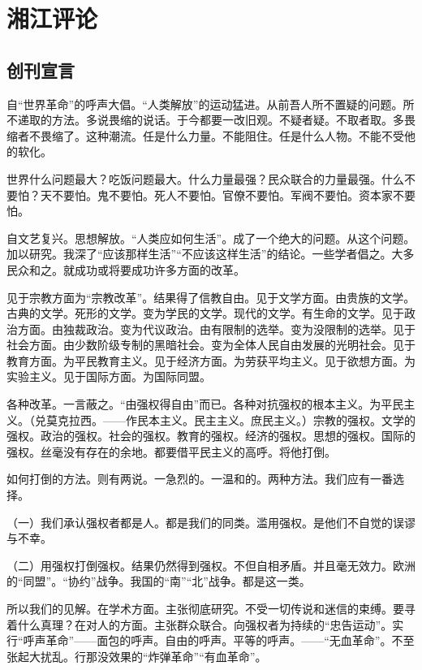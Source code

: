 \section{湘江评论}
\subsection[创刊宣言（一九一九年七月十四日）]{创刊宣言}


自“世界革命”的呼声大倡。“人类解放”的运动猛进。从前吾人所不置疑的问题。所不递取的方法。多说畏缩的说话。于今都要一改旧观。不疑者疑。不取者取。多畏缩者不畏缩了。这种潮流。任是什么力量。不能阻住。任是什么人物。不能不受他的软化。

世界什么问题最大？吃饭问题最大。什么力量最强？民众联合的力量最强。什么不要怕？天不要怕。鬼不要怕。死人不要怕。官僚不要怕。军阀不要怕。资本家不要怕。

自文艺复兴。思想解放。“人类应如何生活”。成了一个绝大的问题。从这个问题。加以研究。我深了“应该那样生活”“不应该这样生活”的结论。一些学者倡之。大多民众和之。就成功或将要成功许多方面的改革。

见于宗教方面为“宗教改革”。结果得了信教自由。见于文学方面。由贵族的文学。古典的文学。死形的文学。变为学民的文学。现代的文学。有生命的文学。见于政治方面。由独裁政治。变为代议政治。由有限制的选举。变为没限制的选举。见于社会方面。由少数阶级专制的黑暗社会。变为全体人民自由发展的光明社会。见于教育方面。为平民教育主义。见于经济方面。为劳获平均主义。见于欲想方面。为实验主义。见于国际方面。为国际同盟。

各种改革。一言蔽之。“由强权得自由”而已。各种对抗强权的根本主义。为平民主义。（兑莫克拉西。——作民本主义。民主主义。庶民主义。）宗教的强权。文学的强权。政治的强权。社会的强权。教育的强权。经济的强权。思想的强权。国际的强权。丝毫没有存在的余地。都要借平民主义的高呼。将他打倒。

如何打倒的方法。则有两说。一急烈的。一温和的。两种方法。我们应有一番选择。

（一）我们承认强权者都是人。都是我们的同类。滥用强权。是他们不自觉的误谬与不幸。

（二）用强权打倒强权。结果仍然得到强权。不但自相矛盾。并且毫无效力。欧洲的“同盟”。“协约”战争。我国的“南”“北”战争。都是这一类。

所以我们的见解。在学术方面。主张彻底研究。不受一切传说和迷信的束缚。要寻着什么真理？在对人的方面。主张群众联合。向强权者为持续的“忠告运动”。实行“呼声革命”——面包的呼声。自由的呼声。平等的呼声。——“无血革命”。不至张起大扰乱。行那没效果的“炸弹革命”“有血革命”。

